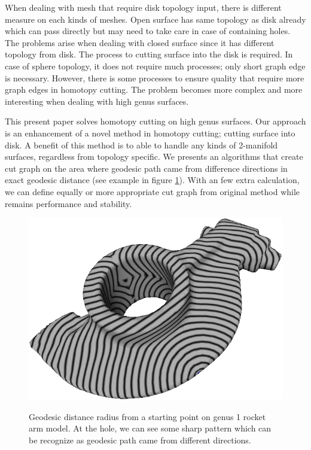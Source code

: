 \documentclass[a4paper,twoside]{article}
\begin{document}
When dealing with mesh that require disk topology input, there is different measure on each kinds of meshes. Open surface has same topology as disk already which can pass directly but may need to take care in case of containing holes. The problems arise when dealing with closed surface since it has different topology from disk. The process to cutting surface into the disk is required. In case of sphere topology, it does not require much processes; only short graph edge is necessary. However, there is some processes to ensure quality that require more graph edges in homotopy cutting. The problem becomes more complex and more interesting when dealing with high genus surfaces. 
   
This present paper solves homotopy cutting on high genus surfaces. Our approach is an enhancement of a novel method \cite{Gu:2002:GI:566654.566589} in homotopy cutting; cutting surface into disk. A benefit of this method is to able to handle any kinds of 2-manifold surfaces, regardless from topology specific. We presents an algorithms that create cut graph on the area where geodesic path came from difference directions in exact geodesic distance \cite{Mitchell:1987:DGP:33367.33372,Surazhsky:2005:FEA:1073204.1073228} (see example in figure \ref{fig:geodesic rocket arm}). With an few extra calculation,  we can define equally or more appropriate cut graph from original method while remains performance and stability.
\begin{figure}[!h]
	\centering
	{\includegraphics[width=0.9\columnwidth]{images/geodesic_rocket-arm.png}}
	\caption{Geodesic distance radius from a starting point on genus 1 rocket arm model. At the hole, we can see some sharp pattern which can be recognize as geodesic path came from different directions.}
	\label{fig:geodesic rocket arm}
\end{figure}
\end{document}
